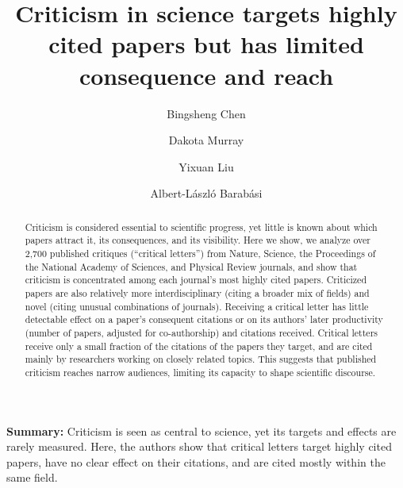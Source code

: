 \documentclass[12pt,a4paper]{article}
\numberwithin{equation}{section}
\begin{document}
\title{Criticism in science targets highly cited papers but has limited consequence and reach}

\author[\Yinyang ,a]{Bingsheng Chen}
\author[\Yinyang ,b]{Dakota Murray}
\author[a]{Yixuan Liu}
\author[a,c,d]{Albert-L\'{a}szl\'{o}  Barab\'{a}si }


\maketitle

\textbf{Summary:} Criticism is seen as central to science, yet its targets and effects are rarely measured. Here, the authors show that critical letters target highly cited papers, have no clear effect on their citations, and are cited mostly within the same field.

\clearpage
\begin{abstract} 
Criticism is considered essential to scientific progress, yet little is known about which papers attract it, its consequences, and its visibility.
Here we show, we analyze over 2,700 published critiques (``critical letters'') from Nature, Science, the Proceedings of the National Academy of Sciences, and Physical Review journals, and show that criticism is concentrated among each journal's most highly cited papers.
Criticized papers are also relatively more interdisciplinary (citing a broader mix of fields) and  novel (citing unusual combinations of journals).
Receiving a critical letter has little detectable effect on a paper's consequent citations or on its authors' later productivity (number of papers, adjusted for co-authorship) and citations received.
Critical letters receive only a small fraction of the citations of the papers they target, and are cited mainly by researchers working on closely related topics.
This suggests that published criticism reaches narrow audiences, limiting its capacity to shape scientific discourse.
\end{abstract}
\end{document}
